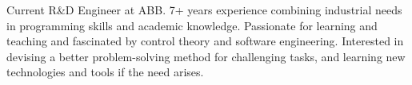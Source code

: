 

\begin{cvparagraph}

Current R\&D Engineer at ABB. 7+ years experience combining industrial needs in programming skills and academic knowledge.
Passionate for learning and teaching and fascinated by control theory and software engineering.
Interested in devising a better problem-solving method for challenging tasks, and
learning new technologies and tools if the need arises.
\end{cvparagraph}
